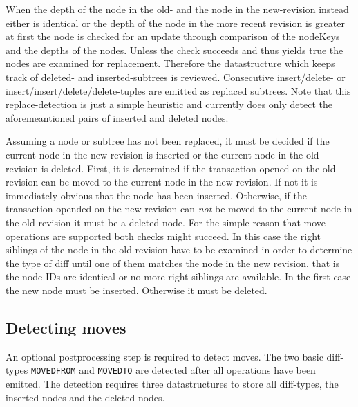 When the depth of the node in the old- and the node in the new-revision instead either is identical or the depth of the node in the more recent revision is greater at first the node is checked for an update through comparison of the nodeKeys and the depths of the nodes. Unless the check succeeds and thus yields true the nodes are examined for replacement. Therefore the datastructure which keeps track of deleted- and inserted-subtrees is reviewed. Consecutive insert/delete- or insert/insert/delete/delete-tuples are emitted as replaced subtrees. Note that this replace-detection is just a simple heuristic and currently does only detect the aforemeantioned pairs of inserted and deleted nodes.%

Assuming a node or subtree has not been replaced, it must be decided if the current node in the new revision is inserted or the current node in the old revision is deleted. First, it is determined if the transaction opened on the old revision can be moved to the current node in the new revision. If not it is immediately obvious that the node has been inserted. Otherwise, if the transaction opended on the new revision can \emph{not} be moved to the current node in the old revision it must be a deleted node. For the simple reason that move-operations are supported both checks might succeed. In this case the right siblings of the node in the old revision have to be examined in order to determine the type of diff until one of them matches the node in the new revision, that is the node-IDs are identical or no more right siblings are available. In the first case the new node must be inserted. Otherwise it must be deleted.

\subsection{Detecting moves}
An optional postprocessing step is required to detect moves. The two basic diff-types \texttt{MOVEDFROM} and \texttt{MOVEDTO} are detected after all operations have been emitted. The detection requires three datastructures to store all diff-types, the inserted nodes and the deleted nodes.

